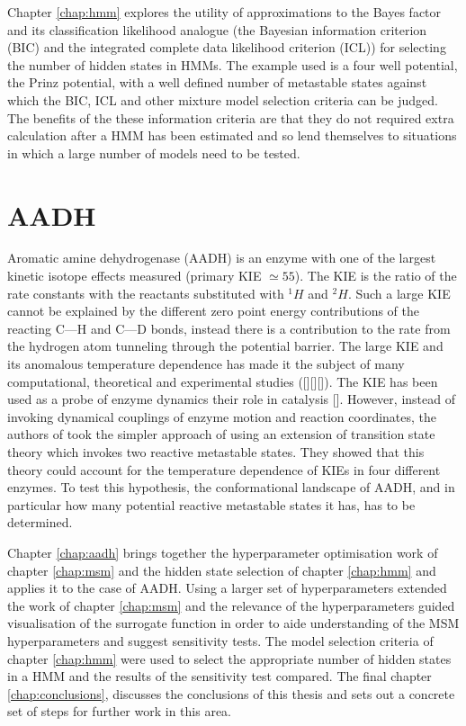 Chapter \ref{chap:hmm} explores the utility of approximations to the Bayes factor and its classification likelihood analogue (the Bayesian information criterion (BIC) and the integrated complete data likelihood criterion (ICL)) for selecting the number of hidden states in HMMs. The example used is a four well potential, the Prinz potential, with a well defined number of metastable states against which the BIC, ICL and other mixture model selection criteria can be judged. The benefits of the these information criteria are that they do not required extra calculation after a HMM has been estimated and so lend themselves to situations in which a large number of models need to be tested. 

\section{AADH}
Aromatic amine dehydrogenase (AADH) is an enzyme with one of the largest kinetic isotope effects measured (primary KIE $\simeq 55$).  The KIE is the ratio of the rate constants with the reactants substituted with $^1H$ and $^{2}H$. Such a large KIE cannot be explained by the different zero point energy contributions of the reacting C---H and C---D bonds, instead there is a contribution to the rate from the hydrogen atom tunneling through the potential barrier. The large KIE and its anomalous temperature dependence has made it the subject of many computational, theoretical and experimental studies ([][][]). The KIE has been used as a probe of enzyme dynamics their role in catalysis []. However, instead of invoking dynamical couplings of enzyme motion and reaction coordinates, the authors of \cite{glowackiProteinDynamicsEnzyme2012a} took the simpler approach of using an extension of transition state theory which invokes two reactive metastable states. They showed that this theory could account for the temperature dependence of KIEs in four different enzymes. To test this hypothesis, the conformational landscape of AADH, and in particular how many potential reactive metastable states it has, has to be determined. 

Chapter \ref{chap:aadh} brings together the hyperparameter optimisation work of chapter  \ref{chap:msm} and the hidden state selection of chapter \ref{chap:hmm} and applies it to the case of AADH. Using a larger set of hyperparameters extended the work of chapter \ref{chap:msm} and the relevance of the hyperparameters guided visualisation of the surrogate function in order to aide understanding of the MSM hyperparameters and suggest sensitivity tests. The model selection criteria of chapter \ref{chap:hmm} were used to select the appropriate number of hidden states in a HMM and the results of the sensitivity test compared. The final chapter \ref{chap:conclusions}, discusses the conclusions of this thesis and sets out a concrete set of steps for further work in this area. 


